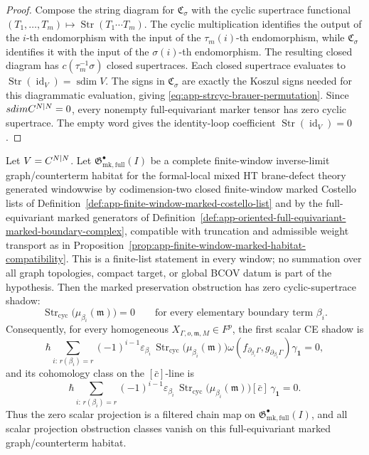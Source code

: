 \begin{proof}
  Compose the string diagram for \(\mathfrak C_\sigma\) with the cyclic
  supertrace functional
  \((T_1,\ldots,T_m)\mapsto\operatorname{Str}(T_1\cdots T_m)\).  The
  cyclic multiplication identifies the output of the \(i\)-th
  endomorphism with the input of the \(\tau_m(i)\)-th endomorphism,
  while \(\mathfrak C_\sigma\) identifies it with the input of the
  \(\sigma(i)\)-th endomorphism.  The resulting closed diagram has
  \(c(\tau_m^{-1}\sigma)\) closed supertraces.  Each closed supertrace
  evaluates to
  \(\operatorname{Str}(\operatorname{id}_V)=\operatorname{sdim}V\).
  The signs in \(\mathfrak C_\sigma\) are exactly the Koszul signs needed
  for this diagrammatic evaluation, giving
  \eqref{eq:app-strcyc-brauer-permutation}.  Since
  \(sdimC^{N|N}=0\), every nonempty full-equivariant
  marker tensor has zero cyclic supertrace.  The empty word gives the
  identity-loop coefficient
  \(\operatorname{Str}(\operatorname{id}_V)=0\).
\end{proof}

\begin{thm}
\label{thm:app-full-equivariant-marked-shadow-vanishing}
  Let \(V=C^{N|N}\).  Let
  \(\mathfrak G^\bullet_{\mathrm{mk,full}}(I)\) be a complete
  finite-window inverse-limit graph/counterterm habitat for the
  formal-local mixed HT brane-defect theory generated
  windowwise by codimension-two closed finite-window marked Costello lists
  of Definition~\ref{def:app-finite-window-marked-costello-list} and by the
  full-equivariant marked generators of
  Definition~\ref{def:app-oriented-full-equivariant-marked-boundary-complex},
  compatible with truncation and admissible weight transport as in
  Proposition~\ref{prop:app-finite-window-marked-habitat-compatibility}.
  This is a finite-list statement in every window; no summation over all
  graph topologies, compact target, or global BCOV datum is part of the
  hypothesis.  Then the marked preservation obstruction has zero
  cyclic-supertrace shadow:
  \[
    \operatorname{Str}_{\mathrm{cyc}}
      \bigl(\mu_{\beta_i}(\mathfrak m)\bigr)=0
    \qquad\text{for every elementary boundary term } \beta_i.
  \]
  Consequently, for every homogeneous
  \(X_{\Gamma,o,\mathfrak m,M}\in F^p\), the first scalar CE shadow is
  \[
    \hbar
    \sum_{i:\,r(\beta_i)=r}
      (-1)^{i-1}
      \varepsilon_{\beta_i}\,
      \operatorname{Str}_{\mathrm{cyc}}
        \bigl(\mu_{\beta_i}(\mathfrak m)\bigr)
      \omega(f_{\partial_{\beta_i}\Gamma},
             g_{\partial_{\beta_i}\Gamma})
      \gamma_{\mathbf 1}
      =0,
  \]
  and its cohomology class on the \([\bar c]\)-line is
  \[
    \hbar
    \sum_{i:\,r(\beta_i)=r}
      (-1)^{i-1}
      \varepsilon_{\beta_i}\,
      \operatorname{Str}_{\mathrm{cyc}}
        \bigl(\mu_{\beta_i}(\mathfrak m)\bigr)
      [\bar c]\,\gamma_{\mathbf 1}
      =0 .
  \]
  Thus the zero scalar projection is a filtered chain map on
  \(\mathfrak G^\bullet_{\mathrm{mk,full}}(I)\), and all scalar
  projection obstruction classes vanish on this full-equivariant marked
  graph/counterterm habitat.
\end{thm}

